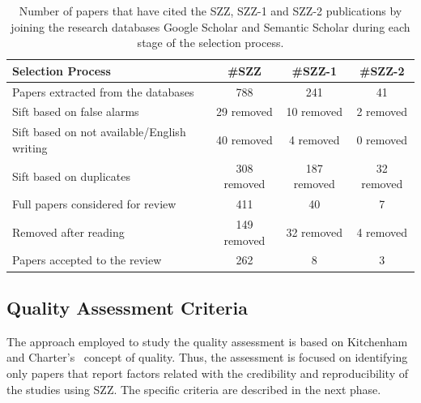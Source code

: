 \documentclass[a4paper, 12pt]{book}
\begin{document}
\begin{table}[!t]
\renewcommand{\arraystretch}{0.8}
\caption{Number of papers that have cited the SZZ, SZZ-1 and SZZ-2 publications by joining the research databases Google Scholar and Semantic Scholar during each stage of the selection process.}
\label{tableSelectedPapers}
\centering
\begin{adjustbox}{max width=\textwidth}
\begin{tabular}{|l|c|c|c|}
\hline
Selection Process & \#SZZ & \#SZZ-1 & \#SZZ-2 \\
\hline
\hline
Papers extracted from the databases & 788 & 241 & 41  \\
\hline
Sift based on false alarms & 29 removed & 10 removed & 2 removed  \\
\hline
Sift based on not available/English writing & 40 removed & 4 removed & 0 removed  \\
\hline
Sift based on duplicates & 308 removed & 187 removed & 32 removed \\
\hline
Full papers considered for review & 411 & 40 & 7 \\
\hline
Removed after reading & 149 removed & 32 removed & 4 removed \\
\hline
Papers accepted to the review & 262 & 8 & 3 \\
\hline
\end{tabular}
\end{adjustbox}
\end{table}

\subsection{Quality Assessment Criteria}
\label{subsec:quality}

The approach employed to study the quality assessment is based on Kitchenham and Charter's~\cite{Kitchenham07guidelinesfor} concept of quality. 
Thus, the assessment is focused on identifying only papers that report factors related with the credibility and reproducibility of the studies using SZZ.
The specific criteria are described in the next phase.
\end{document}
